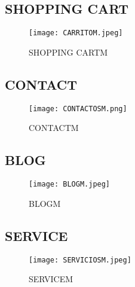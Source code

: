 \documentclass[journal]{IEEEtran}
\begin{document}
\subsection{SHOPPING CART}
\begin{figure}[h]
    \centering
    \texttt{[image: CARRITOM.jpeg]}
    \caption{SHOPPING CARTM}
    \label{fig:ejemplo}
\end{figure}

\newpage
\subsection{CONTACT}
\begin{figure}[h]
    \centering
    \texttt{[image: CONTACTOSM.png]}
    \caption{CONTACTM}
    \label{fig:ejemplo}
\end{figure}

\newpage
\subsection{BLOG}
\begin{figure}[h]
    \centering
    \texttt{[image: BLOGM.jpeg]}
    \caption{BLOGM}
    \label{fig:ejemplo}
\end{figure}

\newpage
\subsection{SERVICE}
\begin{figure}[h]
    \centering
    \texttt{[image: SERVICIOSM.jpeg]}
    \caption{SERVICEM}
    \label{fig:ejemplo}
\end{figure}
\end{document}
